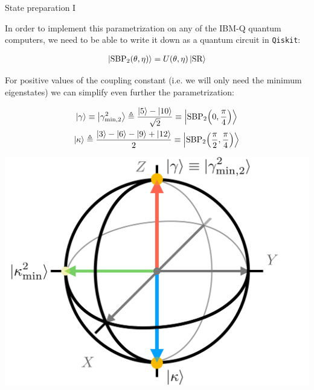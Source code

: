 \documentclass[9pt, aspectratio=169]{beamer}
\begin{document}
\begin{frame}{State preparation I}

	\vspace{-1em}
	\begin{multicols}{2}

		In order to implement this parametrization on any of the IBM-Q quantum computers, we need to be able to write it down as a quantum circuit in \texttt{Qiskit}:

		\begin{gather*}
		  \ket{\text{SBP}_{2} \qty(\theta, \eta)} =
		    U\qty(\theta, \eta) \ket{\text{SR}}
		\end{gather*}

		For positive values of the coupling constant (i.e. we will only need the minimum eigenstates) we can simplify even further the parametrization:

		\begin{gather*}
		  \ket{\gamma} \equiv
		    \ket{\gamma_{\text{min},2}^2} \triangleq
		    \frac{\ket{5} - \ket{10}}{\sqrt{2}} \equiv
		    \ket{\text{SBP}_{2} \qty(0, \frac{\pi}{4})} \\
		  \ket{\kappa} \triangleq
		    \frac{\ket{3}-\ket{6}-\ket{9}+\ket{12}}{2} \equiv
		    \ket{\text{SBP}_{2} \qty(\frac{\pi}{2}, \frac{\pi}{4})}
		\end{gather*}

		\columnbreak \pause

		\begin{center}
			\includegraphics[width=.4\paperwidth]{Figures/NJL1-model-solving/bloch-sphere}
		\end{center}

	\end{multicols}

\end{frame}
\end{document}
